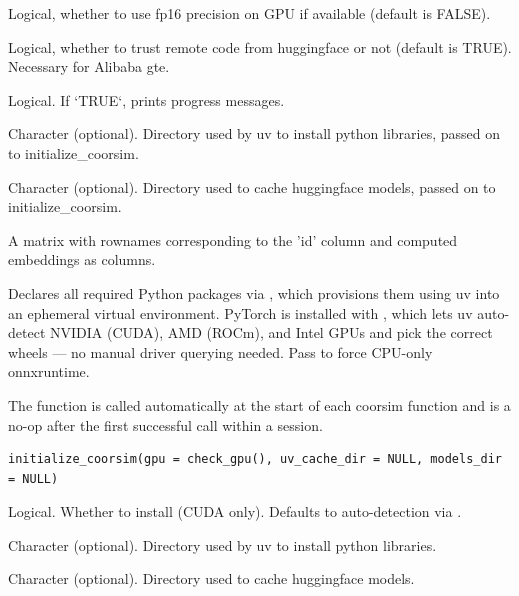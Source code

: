 \documentclass[a4paper]{book}
\begin{document}
\begin{Arguments}
\begin{ldescription}
\item[\code{use\_fp16}] Logical, whether to use fp16 precision on GPU if available (default is FALSE).

\item[\code{trust\_remote\_code}] Logical, whether to trust remote code from huggingface or not (default is TRUE). Necessary for Alibaba gte.

\item[\code{verbose}] Logical. If `TRUE`, prints progress messages.

\item[\code{uv\_cache\_dir}] Character (optional). Directory used by uv to install python libraries, passed on to initialize\_coorsim.

\item[\code{models\_dir}] Character (optional).  Directory used to cache huggingface models, passed on to initialize\_coorsim.
\end{ldescription}
\end{Arguments}
%
\begin{Value}
A matrix with rownames corresponding to the 'id' column and computed embeddings as columns.
\end{Value}
%
\begin{Description}
Declares all required Python packages via ,
which provisions them using uv into an ephemeral virtual environment.
PyTorch is installed with , which lets uv
auto-detect NVIDIA (CUDA), AMD (ROCm), and Intel GPUs and pick the correct
wheels — no manual driver querying needed. Pass  to force
CPU-only onnxruntime.

The function is called automatically at the start of each coorsim function
and is a no-op after the first successful call within a session.
\end{Description}
%
\begin{Usage}
\begin{verbatim}
initialize_coorsim(gpu = check_gpu(), uv_cache_dir = NULL, models_dir = NULL)
\end{verbatim}
\end{Usage}
%
\begin{Arguments}
\begin{ldescription}
\item[\code{gpu}] Logical. Whether to install  (CUDA only).
Defaults to auto-detection via .

\item[\code{uv\_cache\_dir}] Character (optional). Directory used by uv to install python libraries.

\item[\code{models\_dir}] Character (optional).  Directory used to cache huggingface models.
\end{ldescription}
\end{Arguments}
\end{document}
